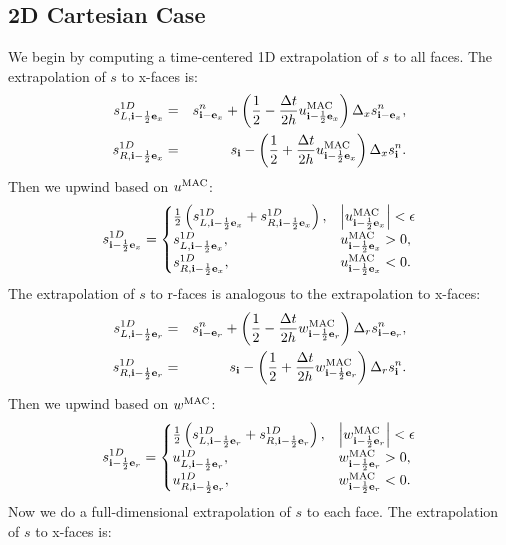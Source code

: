 \subsection{2D Cartesian Case}
We begin by computing a time-centered 1D extrapolation of $s$ to all
faces.  The extrapolation of $s$ to x-faces is:
\begin{eqnarray}
s_{L,{\bf i}-\frac{1}{2}{\bf e}_x}^{1D} &=& s_{{\bf i}-{\bf e}_x}^n + \left(\frac{1}{2} - \frac{\Delta t}{2h}u_{{\bf i}-\frac{1}{2}{\bf e}_x}^{\rm MAC}\right)\Delta_x s_{{\bf i}-{\bf e}_x}^n, \\
s_{R,{\bf i}-\frac{1}{2}{\bf e}_x}^{1D} &=& s_{{\bf i}} - \left(\frac{1}{2} + \frac{\Delta t}{2h}u_{{\bf i}-\frac{1}{2}{\bf e}_x}^{\rm MAC}\right)\Delta_x s_{{\bf i}}^n.
\end{eqnarray}
Then we upwind based on $u^{\rm MAC}$:
\begin{equation}
s_{{\bf i}-\frac{1}{2}{\bf e}_x}^{1D} =
\begin{cases}
\frac{1}{2}\left(s_{L,{\bf i}-\frac{1}{2}{\bf e}_x}^{1D} + s_{R,{\bf i}-\frac{1}{2}{\bf e}_x}^{1D}\right), & \left|u^{\rm MAC}_{{\bf i}-\frac{1}{2}{\bf e}_x}\right| < \epsilon \\
s_{L,{\bf i}-\frac{1}{2}{\bf e}_x}^{1D}, & u^{\rm MAC}_{{\bf i}-\frac{1}{2}{\bf e}_x} > 0, \\
s_{R,{\bf i}-\frac{1}{2}{\bf e}_x}^{1D}, & u^{\rm MAC}_{{\bf i}-\frac{1}{2}{\bf e}_x} < 0. \\
\end{cases}
\end{equation}
The extrapolation of $s$ to r-faces is analogous to the extrapolation
to x-faces:
\begin{eqnarray}
s_{L,{\bf i}-\frac{1}{2}{\bf e}_r}^{1D} &=& s_{{\bf i}-{\bf e}_r}^n + \left(\frac{1}{2} - \frac{\Delta t}{2h}w_{{\bf i}-\frac{1}{2}{\bf e}_r}^{\rm MAC}\right)\Delta_r s_{{\bf i}-{\bf e}_r}^n, \\
s_{R,{\bf i}-\frac{1}{2}{\bf e}_r}^{1D} &=& s_{{\bf i}} - \left(\frac{1}{2} + \frac{\Delta t}{2h}w_{{\bf i}-\frac{1}{2}{\bf e}_r}^{\rm MAC}\right)\Delta_r s_{{\bf i}}^n.
\end{eqnarray}
Then we upwind based on $w^{\rm MAC}$:
\begin{equation}
s_{{\bf i}-\frac{1}{2}{\bf e}_r}^{1D} =
\begin{cases}
\frac{1}{2}\left(s_{L,{\bf i}-\frac{1}{2}{\bf e}_r}^{1D} + s_{R,{\bf i}-\frac{1}{2}{\bf e}_r}^{1D}\right), & \left|w^{\rm MAC}_{{\bf i}-\frac{1}{2}{\bf e}_r}\right| < \epsilon \\
u_{L,{\bf i}-\frac{1}{2}{\bf e}_r}^{1D}, & w^{\rm MAC}_{{\bf i}-\frac{1}{2}{\bf e}_r} > 0, \\
u_{R,{\bf i}-\frac{1}{2}{\bf e}_r}^{1D}, & w^{\rm MAC}_{{\bf i}-\frac{1}{2}{\bf e}_r} < 0. \\
\end{cases}
\end{equation}
Now we do a full-dimensional extrapolation of $s$ to each face.  The
extrapolation of $s$ to x-faces is:
